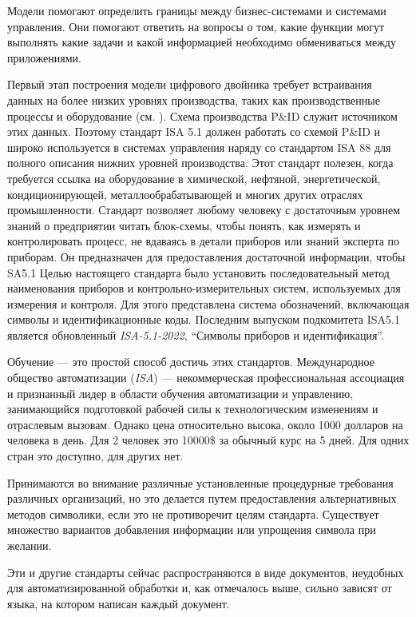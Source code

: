 Модели помогают определить границы между бизнес-системами и системами управления. Они помогают ответить на вопросы о том, какие функции могут выполнять какие задачи и какой информацией необходимо обмениваться между приложениями.

Первый этап построения модели цифрового двойника требует встраивания данных на более низких уровнях производства, таких как производственные процессы и оборудование (см. ). Схема производства P\&ID служит источником этих данных. Поэтому стандарт ISA 5.1 \cite{ISA_5_1} должен работать со схемой P\&ID и широко используется в системах управления наряду со стандартом ISA 88 для полного описания нижних уровней производства. Этот стандарт полезен, когда требуется ссылка на оборудование в химической, нефтяной, энергетической, кондиционирующей, металлообрабатывающей и многих других отраслях промышленности. Стандарт позволяет любому человеку с достаточным уровнем знаний о предприятии читать блок-схемы, чтобы понять, как измерять и контролировать процесс, не вдаваясь в детали приборов или знаний эксперта по приборам. Он предназначен для предоставления достаточной информации, чтобы SA5.1 Целью настоящего стандарта было установить последовательный метод наименования приборов и контрольно-измерительных систем, используемых для измерения и контроля. Для этого представлена система обозначений, включающая символы и идентификационные коды. Последним выпуском подкомитета ISA5.1 является обновленный \textit {ISA-5.1-2022}, ``Символы приборов и идентификация''.

Обучение — это простой способ достичь этих стандартов. Международное общество автоматизации (\textit {ISA}) — некоммерческая профессиональная ассоциация и признанный лидер в области обучения автоматизации и управлению, занимающийся подготовкой рабочей силы к технологическим изменениям и отраслевым вызовам. Однако цена относительно высока, около 1000 долларов на человека в день. Для 2 человек это 10000\$ за обычный курс на 5 дней. Для одних стран это доступно, для других нет.

Принимаются во внимание различные установленные процедурные требования различных организаций, но это делается путем предоставления альтернативных методов символики, если это не противоречит целям стандарта. Существует множество вариантов добавления информации или упрощения символа при желании.

Эти и другие стандарты сейчас распространяются в виде документов, неудобных для автоматизированной обработки и, как отмечалось выше, сильно зависят от языка, на котором написан каждый документ.

